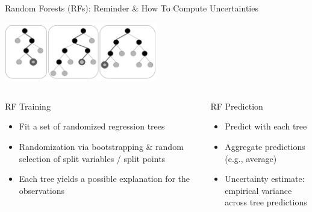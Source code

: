 \begin{frame}[c]{Random Forests (RFs): Reminder \& How To Compute Uncertainties}

\centering
    \includegraphics[width=0.5\textwidth]{images/surrogate_models/random_forest_pic}

\begin{columns}[T] %
\begin{column}{.48\textwidth}

\begin{block}{RF Training}
\begin{itemize}
	\item Fit a set of \alert{randomized} regression trees
	\item Randomization via bootstrapping \& random selection of split variables / split points
	\item Each tree yields a possible explanation for the observations
\end{itemize}
\end{block}
\end{column}

\pause
\hfill

\begin{column}{.48\textwidth}
    \begin{block}{RF Prediction}
    \begin{itemize}
    	\item Predict with each tree
    	\item Aggregate predictions (e.g., average)
    	\item Uncertainty estimate:\\ \alert{empirical variance across tree predictions}
    \end{itemize}
    \end{block}
\end{column}
\end{columns}

\end{frame}
